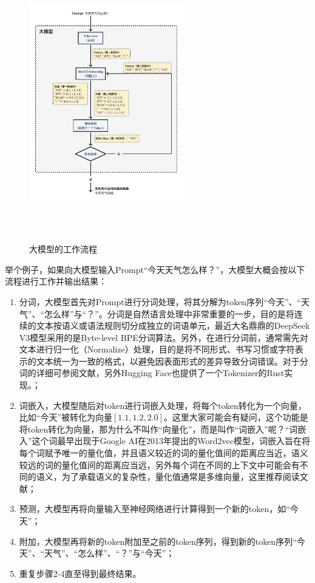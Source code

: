 \documentclass[letterpaper,11pt]{article}
\numberwithin{equation}{section}
\begin{document}
\begin{figure}[!htbp]
    \centering
    \includegraphics[width=0.6\textwidth, height=12cm, keepaspectratio]{../../assets/imgs/ai_share/llm_workflow.pdf}
    \caption{大模型的工作流程}
    \label{fig:llm-workflow}
\end{figure}

举个例子，如果向大模型输入Prompt“今天天气怎么样？”，大模型大概会按以下流程进行工作并输出结果：
\begin{enumerate}
    \item 分词，大模型首先对Prompt进行分词处理，将其分解为token序列“今天”、“天气”、“怎么样”与“？”。分词是自然语言处理中非常重要的一步，目的是将连续的文本按语义或语法规则切分成独立的词语单元，最近大名鼎鼎的DeepSeek V3模型采用的是Byte-level BPE分词算法。另外，在进行分词前，通常需先对文本进行归一化（Normalize）处理，目的是将不同形式、书写习惯或字符表示的文本统一为一致的格式，以避免因表面形式的差异导致分词错误。对于分词的详细可参阅文献\cite{glan2023tokenizer}，另外Hugging Face也提供了一个Tokenizer的Rust实现\cite{huggingface_tokenizers}。；
    \item 词嵌入，大模型随后对token进行词嵌入处理，将每个token转化为一个向量，比如“今天”被转化为向量$[1.1, 1.2, 2.0]$。这里大家可能会有疑问，这个功能是将token转化为向量，那为什么不叫作“向量化”，而是叫作“词嵌入”呢？“词嵌入”这个词最早出现于Google AI在2013年提出的Word2vec模型\cite{mikolov2013efficientestimationwordrepresentations}，词嵌入旨在将每个词赋予唯一的量化值，并且语义较近的词的量化值间的距离应当近，语义较远的词的量化值间的距离应当远，另外每个词在不同的上下文中可能会有不同的语义，为了承载语义的复杂性，量化值通常是多维向量，这里推荐阅读文献\cite{constantine2023wordembedding}；
    \item 预测，大模型再将向量输入至神经网络进行计算得到一个新的token，如“今天”；
    \item 附加，大模型再将新的token附加至之前的token序列，得到新的token序列“今天”、“天气”、“怎么样”、“？”与“今天”；
    \item 重复步骤2-4直至得到最终结果。
\end{enumerate}

\printbibliography[title={引用}]
\end{document}

